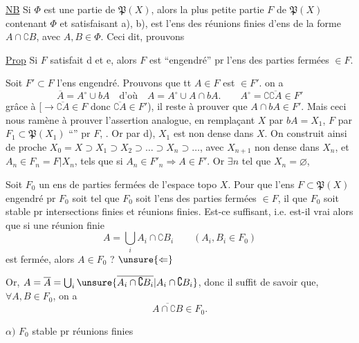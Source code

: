 \uline{NB} Si $\Phi$ est une partie de $\mathfrak P(X)$, alors la plus petite partie $F$ de $\mathfrak P(X)$ contenant $\Phi$ et satisfaisant a), b), est l'ens des  réunions finies d'ens de la forme $A\cap\complement B$, avec $A,B\in\Phi$. Ceci dit, prouvons

\uline{Prop} Si $F$ satisfait d et e, alors $F$ est ``engendré'' pr l'ens des parties fermées $\in F$.

Soit $F'\subset F$ l'ens engendré.  Prouvons que tt $A\in F$ est $\in F'$.  on a
\[
\overline A=A^\circ\cup bA\quad\text{d'où}\quad A=A^\circ\cup A\cap bA.\qquad A^\circ=\complement\overline{\complement A}\in F'
\]
grâce à  [$\to\overline{\complement A}\in F$ donc $\overline{\complement A}\in F'$), il reste à prouver que $A\cap bA\in F'$. Mais ceci nous  ramène à prouver l'assertion analogue, en remplaçant $X$ par $bA=X_1$, $F$  par $F_1\subset\mathfrak P(X_1)$ ``'' pr $F$, . Or par d), $X_1$ est non dense dans $X$. On construit ainsi de proche  $X_0=X\supset X_1\supset X_2\supset\ldots\supset X_n\supset\ldots$, avec $X_{n+1}$ non dense dans $X_n$, et $A_n\in F_n=F|X_n$, tels que si $A_n\in F'_n\Rightarrow A\in F'$. Or $\exists n$ tel que $X_n=\varnothing$, 



Soit $F_0$ un ens de parties fermées de l'espace topo $X$. Pour que l'ens $F\subset\mathfrak P(X)$  engendré pr $F_0$ soit tel que $F_0$ soit  l'ens des parties fermées $\in F$, il  que $F_0$ soit stable pr intersections finies et réunions finies. Est-ce suffisant, i.e. est-il vrai alors que si une réunion finie
\[
A=\bigcup_i A_i\cap\complement B_i\qquad(A_i,B_i\in F_0)
\]
est fermée, alors $A\in F_0$ ? $\unsure{\Leftarrow}$

Or, $A=\overline A=\bigcup_i\unsure{\overline{A_i\cap\complement B_i}|A_i\cap\complement B_i}$, donc il suffit de savoir que, $\forall A,B\in F_0$, on a
\[
\overline{A\cap\complement B}\in F_0.
\]
     

$\alpha)$ $F_0$ stable pr réunions finies

